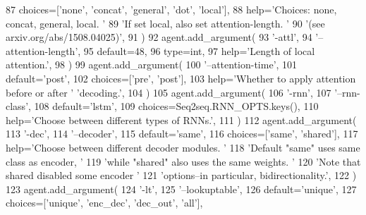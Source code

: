 \begin{DoxyCode}
87             choices=[\textcolor{stringliteral}{'none'}, \textcolor{stringliteral}{'concat'}, \textcolor{stringliteral}{'general'}, \textcolor{stringliteral}{'dot'}, \textcolor{stringliteral}{'local'}],
88             help=\textcolor{stringliteral}{'Choices: none, concat, general, local. '}
89             \textcolor{stringliteral}{'If set local, also set attention-length. '}
90             \textcolor{stringliteral}{'(see arxiv.org/abs/1508.04025)'},
91         )
92         agent.add\_argument(
93             \textcolor{stringliteral}{'-attl'},
94             \textcolor{stringliteral}{'--attention-length'},
95             default=48,
96             type=int,
97             help=\textcolor{stringliteral}{'Length of local attention.'},
98         )
99         agent.add\_argument(
100             \textcolor{stringliteral}{'--attention-time'},
101             default=\textcolor{stringliteral}{'post'},
102             choices=[\textcolor{stringliteral}{'pre'}, \textcolor{stringliteral}{'post'}],
103             help=\textcolor{stringliteral}{'Whether to apply attention before or after '} \textcolor{stringliteral}{'decoding.'},
104         )
105         agent.add\_argument(
106             \textcolor{stringliteral}{'-rnn'},
107             \textcolor{stringliteral}{'--rnn-class'},
108             default=\textcolor{stringliteral}{'lstm'},
109             choices=Seq2seq.RNN\_OPTS.keys(),
110             help=\textcolor{stringliteral}{'Choose between different types of RNNs.'},
111         )
112         agent.add\_argument(
113             \textcolor{stringliteral}{'-dec'},
114             \textcolor{stringliteral}{'--decoder'},
115             default=\textcolor{stringliteral}{'same'},
116             choices=[\textcolor{stringliteral}{'same'}, \textcolor{stringliteral}{'shared'}],
117             help=\textcolor{stringliteral}{'Choose between different decoder modules. '}
118             \textcolor{stringliteral}{'Default "same" uses same class as encoder, '}
119             \textcolor{stringliteral}{'while "shared" also uses the same weights. '}
120             \textcolor{stringliteral}{'Note that shared disabled some encoder '}
121             \textcolor{stringliteral}{'options--in particular, bidirectionality.'},
122         )
123         agent.add\_argument(
124             \textcolor{stringliteral}{'-lt'},
125             \textcolor{stringliteral}{'--lookuptable'},
126             default=\textcolor{stringliteral}{'unique'},
127             choices=[\textcolor{stringliteral}{'unique'}, \textcolor{stringliteral}{'enc\_dec'}, \textcolor{stringliteral}{'dec\_out'}, \textcolor{stringliteral}{'all'}],

\end{DoxyCode}
